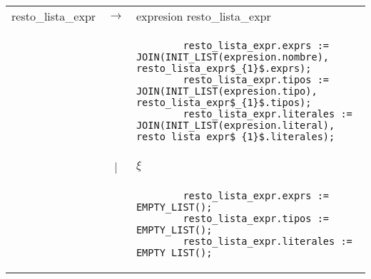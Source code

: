 \begin{tabular}{r c p{}}
			resto\_lista\_expr	& $\longrightarrow$ 	& \ter{,} expresion resto\_lista\_expr \\
								&					& \begin{lstlisting}
        resto_lista_expr.exprs := JOIN(INIT_LIST(expresion.nombre), resto_lista_expr$_{1}$.exprs);
        resto_lista_expr.tipos := JOIN(INIT_LIST(expresion.tipo), resto_lista_expr$_{1}$.tipos);
        resto_lista_expr.literales := JOIN(INIT_LIST(expresion.literal), resto_lista_expr$_{1}$.literales);
                    									\end{lstlisting} \\
									
								& | 					& $\xi$ \\
								&					& \begin{lstlisting}
        resto_lista_expr.exprs := EMPTY_LIST();
        resto_lista_expr.tipos := EMPTY_LIST();
        resto_lista_expr.literales := EMPTY_LIST();
                    									\end{lstlisting} \\
        
        
\end{tabular}


